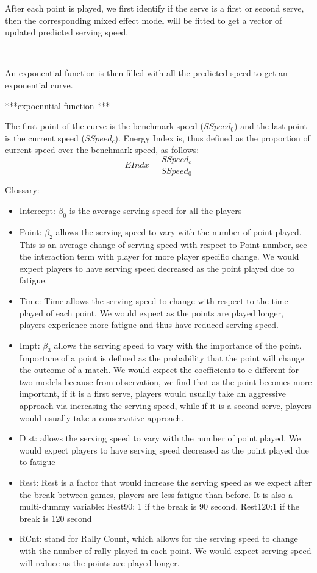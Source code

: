 \documentclass[12pt]{article}
\begin{document}
After each point is played, we first identify if the serve is a first or second serve, then the corresponding mixed effect model will be fitted to get a vector of updated predicted serving speed.  


---------------
---------------

An exponential function is then filled with all the predicted speed to get an exponential curve. 

***expoenntial function ***

The first point of the curve is the benchmark speed ($SSpeed_0$) and the last point is the current speed ($SSpeed_c$). Energy Index is, thus defined as the proportion of current speed over the benchmark speed, as follows: 
\begin{equation}
  EIndx = \frac{SSpeed_c}{SSpeed_0}
\end{equation}



Glossary:
\begin{itemize}
  \item Intercept: $\beta_0$ is the average serving speed for all the players
  \item Point: $\beta_2$ allows the serving speed to vary with the number of point played. This is an average change of serving speed with respect to Point number, see the interaction term with player for more player specific change. We would expect players to have serving speed decreased as the point played due to fatigue. 
  \item Time: Time allows the serving speed to change with respect to the time played of each point. We would expect as the points are played longer, players experience more fatigue and thus have reduced serving speed. 
  \item Impt: $\beta_3$ allows the serving speed to vary with the importance of the point. Importane of a point is defined as the probability that the point will change the outcome of a match. We would expect the coefficients to e different for two models because from observation, we find that as the point becomes more important, if it is a first serve, players would usually take an aggressive approach via increasing the serving speed, while if it is a second serve, players would usually take a conservative approach. 
  \item Dist: allows the serving speed to vary with the number of point played. We would expect players to have serving speed decreased as the point played due to fatigue
  \item Rest: Rest is a factor that would increase the serving speed as we expect after the break between games, players are less fatigue than before. It is also a multi-dummy variable: Rest90: 1 if the break is 90 second, Rest120:1 if the break is 120 second 
  \item RCnt: stand for Rally Count, which allows for the serving speed to change with the number of rally played in each point. We would expect serving speed will reduce as the points are played longer. 
\end{itemize}
\end{document}
